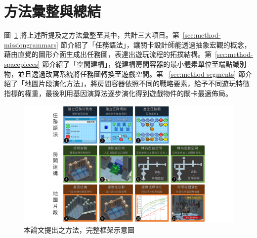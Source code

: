 \section{方法彙整與總結}
\label{sec:method-summary}

圖~\ref{fig:completed-framework} 將上述所提及之方法彙整至其中，共計三大項目。第~\ref{sec:method-missiongrammars} 節介紹了「任務語法」，讓關卡設計師能透過抽象宏觀的概念，藉由直覺的圖形介面生成出任務圖，表達出遊玩流程的拓撲結構。第~\ref{sec:method-spacepieces} 節介紹了「空間建構」，從建構房間容器的最小體素單位至端點識別物，並且透過改寫系統將任務圖轉換至遊戲空間。第 ~\ref{sec:method-segments} 節介紹了「地圖片段演化方法」，將房間容器依照不同的戰略要素，給予不同遊玩特徵指標的權重，最後利用基因演算法逐步演化得到遊戲物件的關卡最適佈局。

\begin{landscape}
  \begin{figure}[!htb]
    \begin{center}
      \includegraphics[width=1.0\linewidth]{figures/completed-framework.pdf}
      \caption{本論文提出之方法，完整框架示意圖} 
      \label{fig:completed-framework}
    \end{center}
  \end{figure}
\end{landscape}